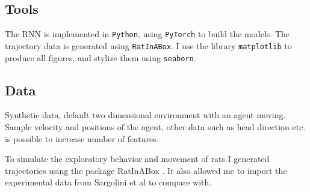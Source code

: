 \subsection{Tools}\label{sssec:tools}
The RNN is implemented in \verb|Python|, using \verb|PyTorch| to build the models. The trajectory data is generated using \verb|RatInABox|. I use the library \verb|matplotlib| to produce all figures, and stylize them using \verb|seaborn|. 

\subsection{Data}\label{sssec:data}
Synthetic data, default two dimensional environment with an agent moving. Sample velocity and positions of the agent, other data such as head direction etc. is possible to increase number of features.

To simulate the exploratory behavior and movement of rats I generated trajectories using the package RatInABox \cite{george:2022:ratinabox}. It also allowed me to import the experimental data from Sargolini et al \cite{sargolini:2006:conjunctive} to compare with.





